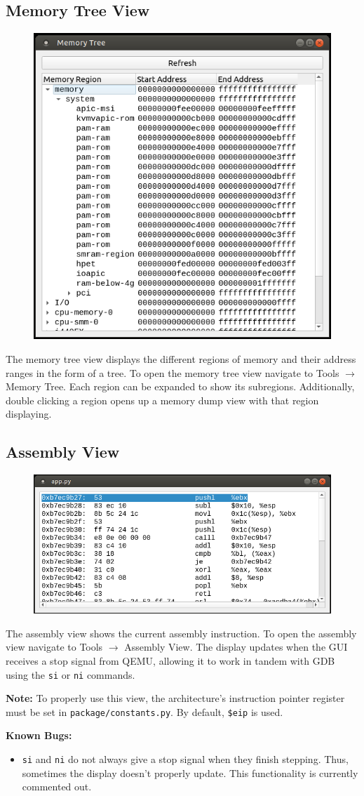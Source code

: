 \documentclass{article}
\newcommand{\code}[1]{\texttt{#1}}
\begin{document}
\subsection{Memory Tree View}
\begin{figure}[h]
    \centering
    \includegraphics[width=.6\textwidth]{images/MemTree.PNG}
    \label{fig:memtree}
\end{figure}
The memory tree view displays the different regions of memory and their address ranges in the form of a tree. To open the memory tree view navigate to Tools $\rightarrow$ Memory Tree. Each region can be expanded to show its subregions. Additionally, double clicking a region opens up a memory dump view with that region displaying.
\newpage
\subsection{Assembly View}
\begin{figure}[h]
    \centering
    \includegraphics[width=.6\textwidth]{images/AssemblyView.PNG}
    \label{fig:asmview}
\end{figure}

The assembly view shows the current assembly instruction. To open the assembly view navigate to Tools $\rightarrow$ Assembly View. The display updates when the GUI receives a stop signal from QEMU, allowing it to work in tandem with GDB using the \code{si} or \code{ni} commands.\par
\textbf{Note:} To properly use this view, the architecture's instruction pointer register must be set in \code{package/constants.py}. By default, \code{\$eip} is used.\par
\textbf{Known Bugs:}
\begin{itemize}
    \item \code{si} and \code{ni} do not always give a stop signal when they finish stepping. Thus, sometimes the display doesn't properly update. This functionality is currently commented out.
\end{itemize}
\end{document}
